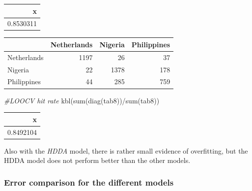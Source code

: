\documentclass[
  11pt,
]{article}
\newenvironment{Shaded}{\begin{snugshade}}{\end{snugshade}}
\newcommand{\AttributeTok}[1]{\textcolor[rgb]{0.77,0.63,0.00}{#1}}
\newcommand{\CommentTok}[1]{\textcolor[rgb]{0.56,0.35,0.01}{\textit{#1}}}
\newcommand{\ConstantTok}[1]{\textcolor[rgb]{0.00,0.00,0.00}{#1}}
\newcommand{\FunctionTok}[1]{\textcolor[rgb]{0.00,0.00,0.00}{#1}}
\newcommand{\NormalTok}[1]{#1}
\newcommand{\OtherTok}[1]{\textcolor[rgb]{0.56,0.35,0.01}{#1}}
\newcommand{\SpecialCharTok}[1]{\textcolor[rgb]{0.00,0.00,0.00}{#1}}
\newcommand{\StringTok}[1]{\textcolor[rgb]{0.31,0.60,0.02}{#1}}
\begin{document}
\begin{tabular}[t]{r}
\hline
x\\
\hline
0.8530311\\
\hline
\end{tabular}

\begin{Shaded}
\end{Shaded}

\begin{tabular}[t]{l|r|r|r}
\hline
  & Netherlands & Nigeria & Philippines\\
\hline
Netherlands & 1197 & 26 & 37\\
\hline
Nigeria & 22 & 1378 & 178\\
\hline
Philippines & 44 & 285 & 759\\
\hline
\end{tabular}

\begin{Shaded}
\begin{Highlighting}[]
\CommentTok{\#LOOCV hit rate}
\FunctionTok{kbl}\NormalTok{(}\FunctionTok{sum}\NormalTok{(}\FunctionTok{diag}\NormalTok{(tab8))}\SpecialCharTok{/}\FunctionTok{sum}\NormalTok{(tab8))}
\end{Highlighting}
\end{Shaded}

\begin{tabular}[t]{r}
\hline
x\\
\hline
0.8492104\\
\hline
\end{tabular}

Also with the \emph{HDDA} model, there is rather small evidence of overfitting, but the HDDA model does not perform better than the other models.

\hypertarget{error-comparison-for-the-different-models}{%
\subsubsection{Error comparison for the different models}\label{error-comparison-for-the-different-models}}
\end{document}
